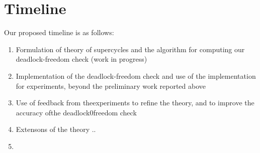 \section{Timeline}

Our proposed timeline is as follows:

\begin{enumerate}
\item Formulation of theory of supercycles and the algorithm for
  computing our deadlock-freedom check (work in progress)

\item Implementation of the deadlock-freedom check and use of the
  implementation for experiments, beyond the preliminary work reported above

\item Use of feedback from theexperiments to refine the theory, and to
  improve the accuracy ofthe deadlock0freedom check

\item Extensons of the theory ..

\item 
\end{enumerate}
